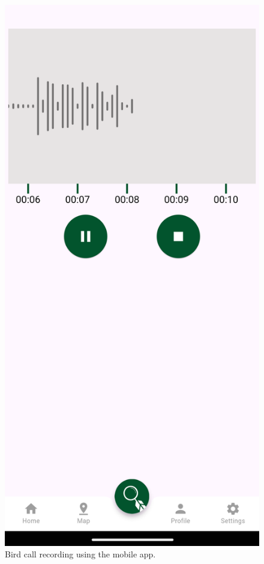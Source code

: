   \begin{figure}[h!]
      \centering
      \includegraphics[scale=0.26]{images/recording.png}
      \caption{Bird call recording using the mobile app.}
  \end{figure}
